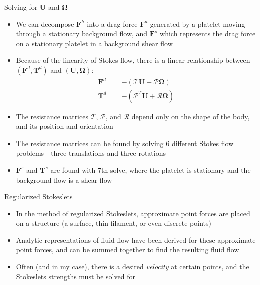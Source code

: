 \documentclass[10pt]{beamer}
\newcommand{\vect}[1]{\boldsymbol{\mathbf{#1}}}
\begin{document}
\begin{frame}{Solving for $\vect{U}$ and $\vect{\Omega}$}
  \begin{itemize}
  \item We can decompose $\vect{F}^h$ into a drag force $\vect{F}^d$
    generated by a platelet moving through a stationary background
    flow, and $\vect{F}^s$ which represents the drag force on a
    stationary platelet in a background shear flow
  \item Because of the linearity of Stokes flow, there is a linear
    relationship between $(\vect{F}^d, \vect{T}^d)$ and $(\vect{U},
    \vect{\Omega})$: 
    \begin{align*}
      \vect{F}^d &= -(\mathcal{T} \vect{U} + \mathcal{P}
      \vect{\Omega}) \\
      \vect{T}^d &= -(\mathcal{P}^T \vect{U} + \mathcal{R}
      \vect{\Omega}) 
    \end{align*}
  \item The resistance matrices $\mathcal{T}$, $\mathcal{P}$, and
    $\mathcal{R}$ depend only on the shape of the body, and its
    position and orientation
  \item The resistance matrices can be found by solving 6 different
    Stokes flow problems---three translations and three
    rotations
  \item $\vect{F}^s$ and $\vect{T}^s$ are found with 7th solve, where
    the platelet is stationary and the background flow is a shear flow
  \end{itemize}
\end{frame}

\begin{frame}{Regularized Stokeslets}
  \begin{itemize}
  \item In the method of regularized Stokeslets, approximate point
    forces are placed on a structure (a surface, thin filament, or
    even discrete points)
  \item Analytic representations of fluid flow have been derived for
    these approximate point forces, and can be summed together to find
    the resulting fluid flow
  \item Often (and in my case), there is a desired \emph{velocity} at
    certain points, and the Stokeslets strengths must be solved for
  \end{itemize}
\end{frame}
\end{document}
